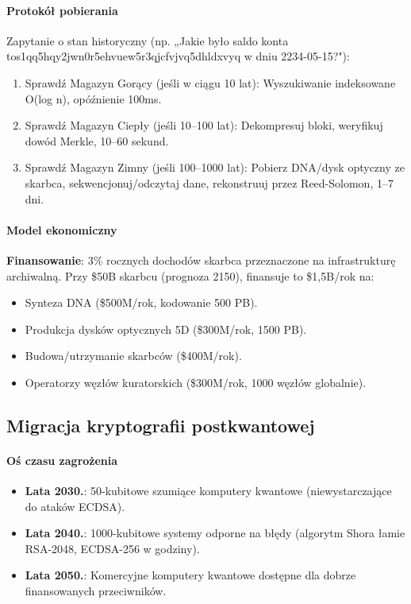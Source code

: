 \documentclass[11pt]{article}
\begin{document}
\paragraph{Protokół pobierania}
Zapytanie o stan historyczny (np. „Jakie było saldo konta tos1qq5hqy2jwn0r5ehvuew5r3qjcfvjvq5dhldxvyq w dniu 2234-05-15?"):
\begin{enumerate}[noitemsep]
  \item Sprawdź Magazyn Gorący (jeśli w ciągu 10 lat): Wyszukiwanie indeksowane O(log n), opóźnienie 100ms.
  \item Sprawdź Magazyn Ciepły (jeśli 10--100 lat): Dekompresuj bloki, weryfikuj dowód Merkle, 10--60 sekund.
  \item Sprawdź Magazyn Zimny (jeśli 100--1000 lat): Pobierz DNA/dysk optyczny ze skarbca, sekwencjonuj/odczytaj dane, rekonstruuj przez Reed-Solomon, 1--7 dni.
\end{enumerate}

\paragraph{Model ekonomiczny}
\textbf{Finansowanie}: 3\% rocznych dochodów skarbca przeznaczone na infrastrukturę archiwalną. Przy \$50B skarbcu (prognoza 2150), finansuje to \$1,5B/rok na:
\begin{itemize}[noitemsep]
  \item Synteza DNA (\$500M/rok, kodowanie 500 PB).
  \item Produkcja dysków optycznych 5D (\$300M/rok, 1500 PB).
  \item Budowa/utrzymanie skarbców (\$400M/rok).
  \item Operatorzy węzłów kuratorskich (\$300M/rok, 1000 węzłów globalnie).
\end{itemize}

\subsection{Migracja kryptografii postkwantowej}

\paragraph{Oś czasu zagrożenia}
\begin{itemize}[noitemsep]
  \item \textbf{Lata 2030.}: 50-kubitowe szumiące komputery kwantowe (niewystarczające do ataków ECDSA).
  \item \textbf{Lata 2040.}: 1000-kubitowe systemy odporne na błędy (algorytm Shora łamie RSA-2048, ECDSA-256 w godziny).
  \item \textbf{Lata 2050.}: Komercyjne komputery kwantowe dostępne dla dobrze finansowanych przeciwników.
\end{itemize}
\end{document}
